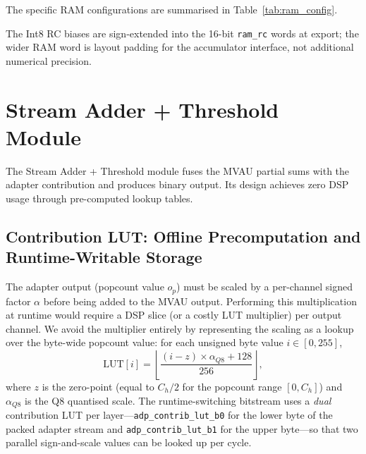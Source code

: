 \documentclass[12pt, a4paper]{report}
\numberwithin{equation}{chapter}
\numberwithin{figure}{chapter}
\numberwithin{table}{chapter}
\numberwithin{algorithm}{chapter}
\begin{document}
The specific RAM configurations are summarised in Table~\ref{tab:ram_config}.

\begin{table}[H]
\centering
\caption{Adapter RAM Configurations (Example: Super4, PE$=4$)}
\label{tab:ram_config}
\end{table}

The Int8 RC biases are sign-extended into the 16-bit \texttt{ram\_rc} words at export; the wider RAM word is layout padding for the accumulator interface, not additional numerical precision.

\section{Stream Adder + Threshold Module}
\label{sec:adder_thresh}

The Stream Adder + Threshold module fuses the MVAU partial sums with the adapter contribution and produces binary output. Its design achieves zero DSP usage through pre-computed lookup tables.

\subsection{Contribution LUT: Offline Precomputation and Runtime-Writable Storage}

The adapter output (popcount value $o_p$) must be scaled by a per-channel signed factor $\alpha$ before being added to the MVAU output. Performing this multiplication at runtime would require a DSP slice (or a costly LUT multiplier) per output channel. We avoid the multiplier entirely by representing the scaling as a lookup over the byte-wide popcount value: for each unsigned byte value $i \in [0, 255]$,
\begin{equation}
\text{LUT}[i] = \left\lfloor \frac{(i - z) \times \alpha_{Q8} + 128}{256} \right\rfloor,
\label{eq:contrib_lut}
\end{equation}
where $z$ is the zero-point (equal to $C_h/2$ for the popcount range $[0, C_h]$) and $\alpha_{Q8}$ is the Q8 quantised scale. The runtime-switching bitstream uses a \emph{dual} contribution LUT per layer---\texttt{adp\_contrib\_lut\_b0} for the lower byte of the packed adapter stream and \texttt{adp\_contrib\_lut\_b1} for the upper byte---so that two parallel sign-and-scale values can be looked up per cycle.
\end{document}
